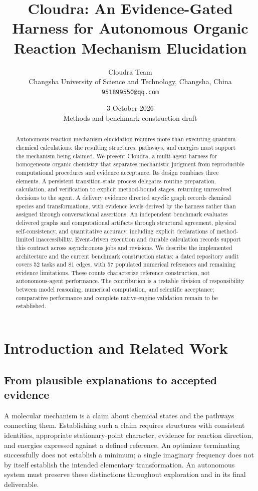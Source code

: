 \documentclass[11pt,a4paper]{article}
\title{Cloudra: An Evidence-Gated Harness for Autonomous Organic Reaction Mechanism Elucidation}
\author{Cloudra Team\\\small Changsha University of Science and Technology, Changsha, China\\\small\texttt{951899550@qq.com}}
\date{3 October 2026\\\small Methods and benchmark-construction draft}
\begin{document}
\maketitle
\begin{abstract}
Autonomous reaction mechanism elucidation requires more than executing quantum-chemical calculations: the resulting structures, pathways, and energies must support the mechanism being claimed. We present Cloudra, a multi-agent harness for homogeneous organic chemistry that separates mechanistic judgment from reproducible computational procedures and evidence acceptance. Its design combines three elements. A persistent transition-state process delegates routine preparation, calculation, and verification to explicit method-bound stages, returning unresolved decisions to the agent. A delivery evidence directed acyclic graph records chemical species and transformations, with evidence levels derived by the harness rather than assigned through conversational assertions. An independent benchmark evaluates delivered graphs and computational artifacts through structural agreement, physical self-consistency, and quantitative accuracy, including explicit declarations of method-limited inaccessibility. Event-driven execution and durable calculation records support this contract across asynchronous jobs and revisions. We describe the implemented architecture and the current benchmark construction status: a dated repository audit covers 52 tasks and 81 edges, with 57 populated numerical references and remaining evidence limitations. These counts characterize reference construction, not autonomous-agent performance. The contribution is a testable division of responsibility between model reasoning, numerical computation, and scientific acceptance; comparative performance and complete native-engine validation remain to be established.
\end{abstract}

\section{Introduction and Related Work}

\subsection{From plausible explanations to accepted evidence}
A molecular mechanism is a claim about chemical states and the pathways connecting them. Establishing such a claim requires structures with consistent identities, appropriate stationary-point character, evidence for reaction direction, and energies expressed against a defined reference. An optimizer terminating successfully does not establish a minimum; a single imaginary frequency does not by itself establish the intended elementary transformation. An autonomous system must preserve these distinctions throughout exploration and in its final deliverable.
\end{document}
